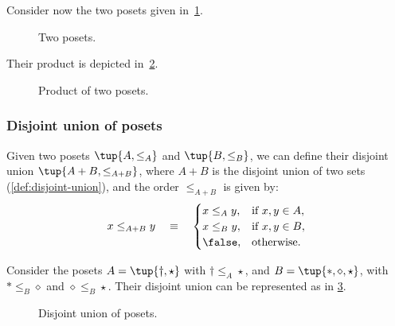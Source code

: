 \begin{example}
Consider now the two posets given in~\cref{fig:composing_posets_1}.
\begin{figure}[h!]
\begin{center}
\end{center}
\caption{Two posets. \label{fig:composing_posets_1}}
\end{figure}
Their product is depicted in~\cref{fig:composing_posets_2}.
\begin{figure}[h!]
\begin{center}
\end{center}
\caption{Product of two posets. \label{fig:composing_posets_2}}
\end{figure}
\end{example}

\subsubsection{Disjoint union of posets}


\begin{definition}
Given two posets $\tup{A, \leq_A} $ and $\tup{B, \leq_B} $,
we can define their disjoint union $\tup{ A + B, \leq_{A + B}}$, where $A + B$
is the disjoint union of two sets (\cref{def:disjoint-union}), and the
order $\leq_{A + B}$ is given by:
\begin{equation}
    x \leq_{A + B} y \quad\equiv\quad
    \begin{cases}
        x \leq_A y, & \text{if } x,y \in A, \\
        x \leq_B y, & \text{if } x,y \in B, \\
        \false,  & \text{otherwise}.
    \end{cases}
\end{equation}
\end{definition}


\begin{example}
Consider the posets $A=\tup{\dagger, \star}$ with $\dagger \leq_A \star$, and $B=\tup{\ast,\diamond,\star}$, with $\ast \leq_B \diamond$ and $\diamond \leq_B \star$. Their disjoint union can be represented as in \cref{fig:poset-coproduct}.

\begin{figure}[h!]
    \centering
    \caption{Disjoint union of posets. \label{fig:poset-coproduct}}
\end{figure}
\end{example}



